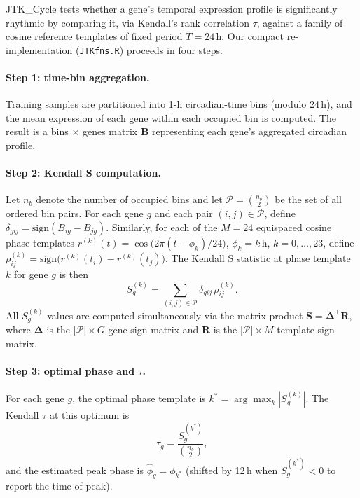 \documentclass[10pt,a4paper]{article}
\begin{document}
JTK\_Cycle \citep{Hughes2010} tests whether a gene's temporal
expression profile is significantly rhythmic by comparing it, via
Kendall's rank correlation $\tau$, against a family of cosine
reference templates of fixed period $T = 24$\,h.
Our compact re-implementation (\texttt{JTKfns.R}) proceeds in four
steps.
 
\paragraph{Step 1: time-bin aggregation.}
Training samples are partitioned into 1-h circadian-time bins
(modulo 24\,h), and the mean expression of each gene within each
occupied bin is computed.
The result is a bins $\times$ genes matrix $\mathbf{B}$ representing
each gene's aggregated circadian profile.
 
\paragraph{Step 2: Kendall S computation.}
Let $n_b$ denote the number of occupied bins and let
$\mathcal{P} = \binom{n_b}{2}$ be the set of all ordered bin pairs.
For each gene $g$ and each pair $(i,j) \in \mathcal{P}$, define
$\delta_{gij} = \mathrm{sign}(B_{ig} - B_{jg})$.
Similarly, for each of the $M = 24$ equispaced cosine phase
templates
$r^{(k)}(t) = \cos\!\bigl(2\pi(t - \phi_k)/24\bigr)$,
$\phi_k = k$\,h, $k = 0,\ldots,23$, define
$\rho_{ij}^{(k)} = \mathrm{sign}\!\bigl(r^{(k)}(t_i) -
r^{(k)}(t_j)\bigr)$.
The Kendall S statistic at phase template $k$ for gene $g$ is then
\begin{equation}
  S_g^{(k)} = \sum_{(i,j)\in\mathcal{P}}
               \delta_{gij}\,\rho_{ij}^{(k)}.
  \label{eq:kendallS}
\end{equation}
All $S_g^{(k)}$ values are computed simultaneously via the matrix
product $\mathbf{S} = \boldsymbol{\Delta}^\top \mathbf{R}$, where
$\boldsymbol{\Delta}$ is the $|\mathcal{P}| \times G$ gene-sign
matrix and $\mathbf{R}$ is the $|\mathcal{P}| \times M$ template-sign
matrix.
 
\paragraph{Step 3: optimal phase and $\tau$.}
For each gene $g$, the optimal phase template is
$k^* = \arg\max_k |S_g^{(k)}|$.
The Kendall $\tau$ at this optimum is
\begin{equation}
  \tau_g = \frac{S_g^{(k^*)}}{\binom{n_b}{2}},
  \label{eq:tau}
\end{equation}
and the estimated peak phase is $\hat\phi_g = \phi_{k^*}$
(shifted by 12\,h when $S_g^{(k^*)} < 0$ to report the time of
peak).
 
\end{document}
